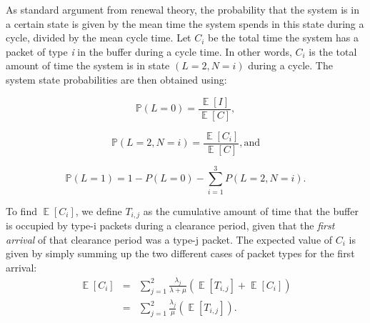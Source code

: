 \documentclass[preprint,12pt]{elsarticle}
\theoremstyle{definition}
\theoremstyle{plain}
\theoremstyle{remark}
\renewcommand{\P}{\ensuremath{\mathbb{P}}}
\DeclareMathOperator{\E}{\mathbb{E}}
\begin{document}
As standard argument from renewal theory, the probability that the system is in a certain state is given by the mean time the system spends in this state during a cycle, divided by the mean cycle time. Let \textit{$C_{i}$} be the total time the system has a packet of type \textit{i} in the buffer during a cycle time. In other words, $C_{i}$ is the total amount of time the system is in state $(L = 2, N = i)$ during a cycle.
The system state probabilities are then obtained using:

     \begin{equation}\label{eq:PL0}
    \P(L=0) = \frac{\E[I]}{\E[C]},
    \end{equation}

    \begin{equation}\label{eq:PL2}
    \P(L=2,N=i) = \frac{\E[C_{i}]}{\E[C]}, \text{and}
    \end{equation}

    \begin{equation}\label{eq:PL1}
    \P(L=1) = 1 - P(L=0) - \sum_{i=1}^3 P(L=2,N=i).
    \end{equation}

To find $\E[C_{i}]$, we define \textit{$T_{i,j}$} as the cumulative amount of time that the buffer is occupied by type-i packets during a clearance period, given that the \textit{first arrival} of that clearance period was a type-j packet. The expected value of \textit{$C_{i}$} is given by simply summing up the two different cases of packet types for the first arrival:
    \begin{eqnarray}\label{eq:ECI}
    \E[C_{i}] & = & \sum_{j=1}^2 \frac{\lambda_{j}}{\lambda + \mu}(\E[T_{i,j}] + \E[C_{i}])\nonumber\\
    & = & \sum_{j=1}^2 \frac{\lambda_{j}}{\mu}(\E[T_{i,j}]).
    \end{eqnarray}
\end{document}
